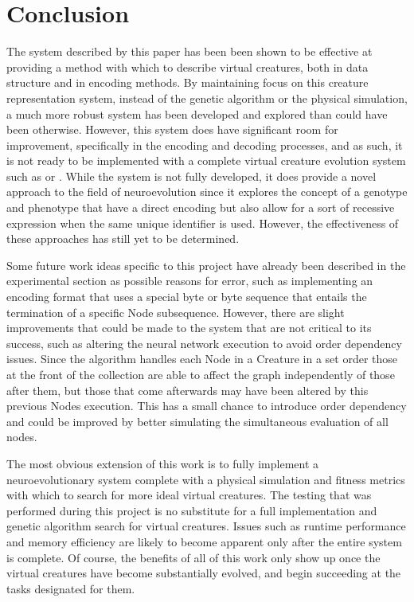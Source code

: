\documentclass[12pt]{article}
\begin{document}
\section*{Conclusion}
The system described by this paper has been been shown to be effective at providing a method with which to describe virtual creatures, both in data structure and in encoding methods.
By maintaining focus on this creature representation system, instead of the genetic algorithm or the physical simulation, a much more robust system has been developed and explored than could have been otherwise.
However, this system does have significant room for improvement, specifically in the encoding and decoding processes, and as such, it is not ready to be implemented with a complete virtual creature evolution system such as \cite{sims1994evolving} or \cite{lehman2011evolving}.
While the system is not fully developed, it does provide a novel approach to the field of neuroevolution since it explores the concept of a genotype and phenotype that have a direct encoding but also allow for a sort of recessive expression when the same unique identifier is used.
However, the effectiveness of these approaches has still yet to be determined.

Some future work ideas specific to this project have already been described in the experimental section as possible reasons for error, such as implementing an encoding format that uses a special byte or byte sequence that entails the termination of a specific Node subsequence.
However, there are slight improvements that could be made to the system that are not critical to its success, such as altering the neural network execution to avoid order dependency issues.
Since the algorithm handles each Node in a Creature in a set order those at the front of the collection are able to affect the graph independently of those after them, but those that come afterwards may have been altered by this previous Nodes execution.
This has a small chance to introduce order dependency and could be improved by better simulating the simultaneous evaluation of all nodes.

The most obvious extension of this work is to fully implement a neuroevolutionary system complete with a physical simulation and fitness metrics with which to search for more ideal virtual creatures.
The testing that was performed during this project is no substitute for a full implementation and genetic algorithm search for virtual creatures.
Issues such as runtime performance and memory efficiency are likely to become apparent only after the entire system is complete.
Of course, the benefits of all of this work only show up once the virtual creatures have become substantially evolved, and begin succeeding at the tasks designated for them.




\end{document}

